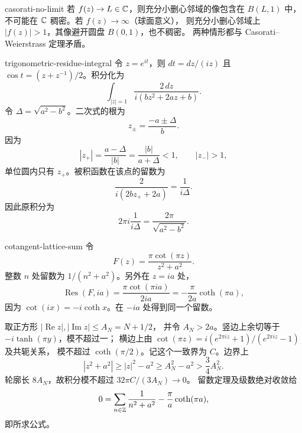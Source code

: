 \begin{solution}{casorati-no-limit}
若 \(f(z)\to L\in\mathbb{C}\)，则充分小删心邻域的像包含在
\(B(L,1)\) 中，不可能在 \(\mathbb{C}\) 稠密。若 \(f(z)\to\infty\)（球面意义），
则充分小删心邻域上 \(|f(z)|>1\)，其像避开圆盘 \(B(0,1)\)，也不稠密。
两种情形都与 Casorati--Weierstrass 定理矛盾。
\end{solution}

\begin{solution}{trigonometric-residue-integral}
令 \(z=e^{it}\)，则 \(dt=dz/(iz)\) 且
\(\cos t=(z+z^{-1})/2\)。积分化为
\[
 \int_{|z|=1}\frac{2\,dz}{i(bz^2+2az+b)}.
\]
令 \(\Delta=\sqrt{a^2-b^2}\)。二次式的根为
\[
 z_\pm=\frac{-a\pm\Delta}{b}.
\]
因为
\[
 |z_+|=\frac{a-\Delta}{|b|}=\frac{|b|}{a+\Delta}<1,\qquad
 |z_-|>1,
\]
单位圆内只有 \(z_+\)。被积函数在该点的留数为
\[
 \frac2{i(2bz_++2a)}
 =\frac1{i\Delta}.
\]
因此原积分为
\[
 2\pi i\frac1{i\Delta}
 =\frac{2\pi}{\sqrt{a^2-b^2}}.
\]
\end{solution}

\begin{solution}{cotangent-lattice-sum}
令
\[
 F(z)=\frac{\pi\cot(\pi z)}{z^2+a^2}.
\]
整数 \(n\) 处留数为 \(1/(n^2+a^2)\)。另外在 \(z=ia\) 处，
\[
 \operatorname{Res}(F,ia)
 =\frac{\pi\cot(\pi ia)}{2ia}
 =-\frac{\pi}{2a}\coth(\pi a),
\]
因为 \(\cot(ix)=-i\coth x\)。在 \(-ia\) 处得到同一个留数。

取正方形 \(|\operatorname{Re}z|,|\operatorname{Im}z|\le A_N=N+1/2\)，
并令 \(A_N>2a\)。竖边上余切等于 \(-i\tanh(\pi y)\)，模不超过一；
横边上由 \(\cot(\pi z)=i(e^{2\pi iz}+1)/(e^{2\pi iz}-1)\) 及共轭关系，
模不超过 \(\coth(\pi/2)\)。记这个一致界为 \(C\)。边界上
\[
 |z^2+a^2|\ge |z|^2-a^2\ge A_N^2-a^2>\frac34 A_N^2.
\]
轮廓长 \(8A_N\)，故积分模不超过 \(32\pi C/(3A_N)\to0\)。
留数定理及级数绝对收敛给
\[
 0=\sum_{n\in\mathbb{Z}}\frac1{n^2+a^2}
 -\frac{\pi}{a}\coth(\pi a),
\]
即所求公式。
\end{solution}

